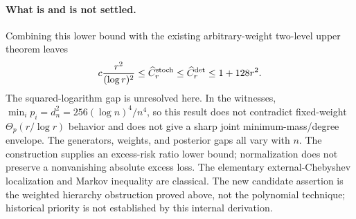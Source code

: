 \paragraph{What is and is not settled.}
Combining this lower bound with the existing arbitrary-weight two-level
upper theorem leaves
\[
 c\frac{r^2}{(\log r)^2}
 \le\widehat C_r^{\mathrm{stoch}}\le\widehat C_r^{\mathrm{det}}
 \le1+128r^2.
\]
The squared-logarithm gap is unresolved here. In the witnesses,
$\min_i p_i=d_n^2=256(\log n)^4/n^4$, so this result does not contradict
fixed-weight $\Theta_p(r/\log r)$ behavior and does not give a sharp joint
minimum-mass/degree envelope. The generators, weights, and posterior gaps
all vary with $n$. The construction supplies an excess-risk ratio lower
bound; normalization does not preserve a nonvanishing absolute excess loss.
The elementary external-Chebyshev localization and Markov inequality are
classical. The new candidate assertion is the weighted hierarchy obstruction
proved above, not the polynomial technique; historical priority is not
established by this internal derivation.
